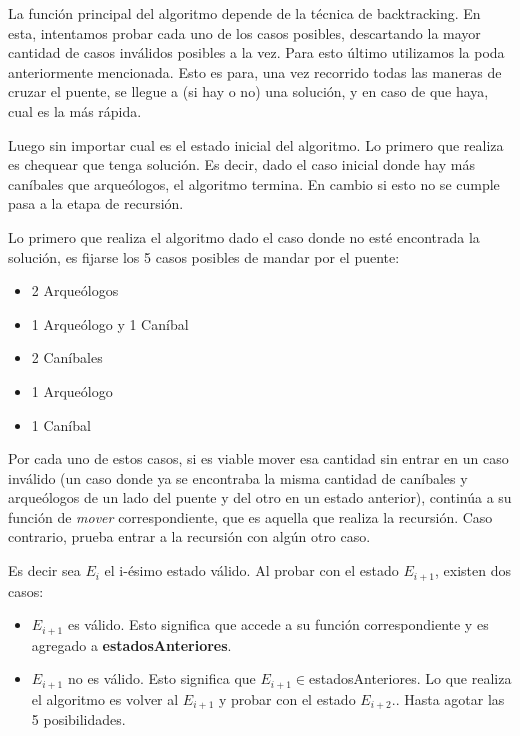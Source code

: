       La función principal del algoritmo depende de la técnica de backtracking. En esta, intentamos probar cada uno de los casos posibles, descartando la mayor cantidad de casos inválidos posibles a la vez. Para esto último utilizamos la poda anteriormente mencionada. Esto es para, una vez recorrido todas las maneras de cruzar el puente, se llegue a (si hay o no) una solución, y en caso de que haya, cual es la más rápida.

      Luego sin importar cual es el estado inicial del algoritmo. Lo primero que realiza es chequear que tenga solución. Es decir, dado el caso inicial donde hay más caníbales que arqueólogos, el algoritmo termina. En cambio si esto no se cumple pasa a la etapa de recursión. 

      Lo primero que realiza el algoritmo dado el caso donde no esté encontrada la solución, es fijarse los 5 casos posibles de mandar por el puente:

      \begin{itemize}
      	\item 2 Arqueólogos
      	\item 1 Arqueólogo y 1 Caníbal
      	\item 2 Caníbales
      	\item 1 Arqueólogo
      	\item 1 Caníbal
      \end{itemize}

       Por cada uno de estos casos, si es viable mover esa cantidad sin entrar en un caso inválido (un caso donde ya se encontraba la misma cantidad de caníbales y arqueólogos de un lado del puente y del otro en un estado anterior), continúa a su función de \emph{mover} correspondiente, que es aquella que realiza la recursión. Caso contrario, prueba entrar a la recursión con algún otro caso. 

       Es decir sea $E_{i}$ el i-ésimo estado válido. Al probar con el estado $E_{i+1}$, existen dos casos:

       \begin{itemize}
       	\item $E_{i+1}$ es válido. Esto significa que accede a su función correspondiente y es agregado a \textbf{estadosAnteriores}.
       	\item $E_{i+1}$ no es válido. Esto significa que  $E_{i+1} \in$estadosAnteriores. Lo que realiza el algoritmo es volver al $E_{i+1}$ y probar con el estado $E_{i+2}$.. Hasta agotar las 5 posibilidades.
       \end{itemize}

